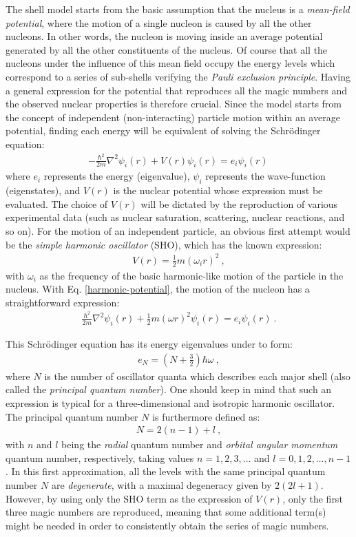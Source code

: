 The shell model starts from the basic assumption that the nucleus is a \emph{mean-field potential}, where the motion of a single nucleon is caused by all the other nucleons. In other words, the nucleon is moving inside an average potential generated by all the other constituents of the nucleus. Of course that all the nucleons under the influence of this mean field occupy the energy levels which correspond to a series of sub-shells verifying the \textit{Pauli exclusion principle}. Having a general expression for the potential that reproduces all the magic numbers and the observed nuclear properties is therefore crucial. Since the model starts from the concept of independent (non-interacting) particle motion within an average potential, finding each energy will be equivalent of solving the Schrödinger equation:
\begin{align}
    -\frac{\hbar^2}{2m}\nabla ^2\psi_i(r)+V(r)\psi_i(r)=e_i\psi_i(r)\, 
    \label{schrodinger-single-particle-eq}
\end{align}
where $e_i$ represents the energy (eigenvalue), $\psi_i$ represents the wave-function (eigenstates), and $V(r)$ is the nuclear potential whose expression must be evaluated. The choice of $V(r)$ will be dictated by the reproduction of various experimental data (such as nuclear saturation, scattering, nuclear reactions, and so on). For the motion of an independent particle, an obvious first attempt would be the \emph{simple harmonic oscillator} (SHO), which has the known expression:
\begin{align}
    V(r)=\frac{1}{2}m(\omega_i r)^2\ ,
    \label{harmonic-potential}
\end{align}
with $\omega_i$ as the frequency of the basic harmonic-like motion of the particle in the nucleus. With Eq. \ref{harmonic-potential}, the motion of the nucleon has a straightforward expression:
\begin{align}
    \frac{\hbar^2}{2m}\nabla^2\psi_i(r)+\frac{1}{2}m(\omega r)^2\psi_i(r)=e_i\psi_i(r)\ .
\end{align}

This Schrödinger equation has its energy eigenvalues under to form:
\begin{align}
    e_N=\left(N+\frac{3}{2}\right)\hbar\omega\ ,
\end{align}
where $N$ is the number of oscillator quanta which describes each major shell (also called the \emph{principal quantum number}). One should keep in mind that such an expression is typical for a three-dimensional and isotropic harmonic oscillator. The principal quantum number $N$ is furthermore defined as:
\begin{align}
    N=2(n-1)+l\ ,
\end{align}
with $n$ and $l$ being the \emph{radial} quantum number and \emph{orbital angular momentum} quantum number, respectively, taking values $n=1,2,3,\dots$ and $l=0,1,2,\dots,n-1$. In this first approximation, all the levels with the same principal quantum number $N$ are \emph{degenerate}, with a maximal degeneracy given by $2(2l+1)$. However, by using only the SHO term as the expression of $V(r)$, only the first three magic numbers are reproduced, meaning that some additional term(s) might be needed in order to consistently obtain the series of magic numbers.

